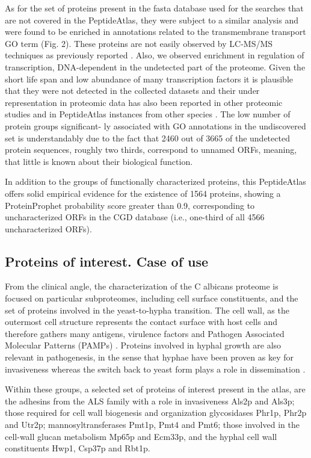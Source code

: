 As for the set of proteins present in the fasta database used
for the searches that are not covered in the PeptideAtlas, they
were subject to a similar analysis and were found to be enriched
in annotations related to the transmembrane transport GO term
(Fig. 2). These proteins are not easily observed by LC-MS/MS
techniques as previously reported \citep{Gunaratne2013b}. Also, we observed
enrichment in regulation of transcription, DNA-dependent in the
undetected part of the proteome. Given the short life span and
low abundance of many transcription factors it is plausible that
they were not detected in the collected datasets and their under
representation in proteomic data has also been reported in other
proteomic studies and in PeptideAtlas instances from other
species \citep{Gunaratne2013b,Ding2013,Simicevic2013}. 
The low number of protein groups significant-
ly associated with GO annotations in the undiscovered set is
understandably due to the fact that 2460 out of 3665 of the
undetected protein sequences, roughly two thirds, correspond to
unnamed ORFs, meaning, that little is known about their
biological function.



In addition to the groups of functionally characterized proteins,
 this PeptideAtlas offers solid empirical evidence for the
existence of 1564 proteins, showing a ProteinProphet probability
score greater than 0.9, corresponding to uncharacterized ORFs in
the CGD database (i.e., one-third of all 4566 uncharacterized ORFs).


\subsection*{Proteins of interest. Case of use}


From the clinical angle, the characterization of the C albicans
proteome is focused on particular subproteomes, including
cell surface constituents, and the set of proteins involved in
the yeast-to-hypha transition. The cell wall, as the outermost
cell structure represents the contact surface with host cells
and therefore gathers many antigens, virulence factors and
Pathogen Associated Molecular Patterns (PAMPs) \citep{Vialas2012}. Proteins
involved in hyphal growth are also relevant in pathogenesis,
in the sense that hyphae have been proven as key for
invasiveness whereas the switch back to yeast form plays a
role in dissemination \citep{Saville2003}.

Within these groups, a selected set of proteins of interest
present in the atlas, are the adhesins from the ALS family with
a role in invasiveness Als2p and Als3p; those required for cell
wall biogenesis and organization glycosidases Phr1p, Phr2p
and Utr2p; mannosyltransferases Pmt1p, Pmt4 and Pmt6;
those involved in the cell-wall glucan metabolism Mp65p and
Ecm33p, and the hyphal cell wall constituents Hwp1, Csp37p
and Rbt1p.

